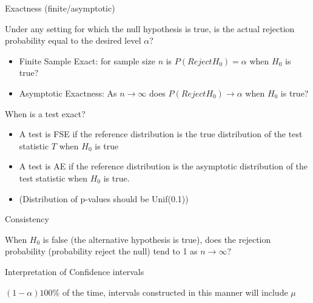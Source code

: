 \documentclass[12pt]{article}
\begin{document}
\begin{note}
    \begin{field}
        Exactness (finite/asymptotic)
    \end{field}
    \begin{field}
        Under any setting for which the null hypothesis is true, is the actual rejection probability equal to the desired level $\alpha$?
            \begin{itemize}
              \item Finite Sample Exact: for sample size $n$ is $P(Reject H_0) = \alpha$ when $H_0$ is true?
              \item Asymptotic Exactness: As $n \to \infty$ does $P(Reject H_0) \to \alpha$ when $H_0$ is true?
            \end{itemize}
    \end{field}
\end{note}

\begin{note}
    \begin{field}
        When is a test exact?
    \end{field}
    \begin{field}
        \begin{itemize}
              \item A test is FSE if the reference distribution is the true distribution of the test statistic $T$ when $H_0$ is true
              \item A test is AE if the reference distribution is the asymptotic distribution of the test statistic when $H_0$ is true.
              \item (Distribution of p-values should be Unif(0.1))
            \end{itemize}
    \end{field}
\end{note}

\begin{note}
    \begin{field}
        Consistency
    \end{field}
    \begin{field}
        When $H_0$ is false (the alternative hypothesis is true), does the rejection probability (probability reject the null) tend to 1 as $n \to \infty$?
    \end{field}
\end{note}

\begin{note}
    \begin{field}
        Interpretation of Confidence intervals
    \end{field}
    \begin{field}
        $(1 - \alpha)100$\% of the time, intervals constructed in this manner will include $\mu$
    \end{field}
\end{note}
\end{document}
